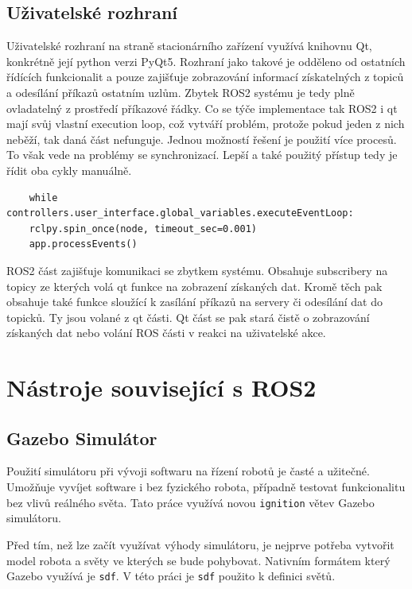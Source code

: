 \section{Uživatelské rozhraní}
Uživatelské rozhraní na straně stacionárního zařízení využívá knihovnu Qt, konkrétně její python verzi PyQt5. Rozhraní jako takové je odděleno od ostatních řídících funkcionalit a pouze zajišťuje zobrazování informací získatelných z topiců a odesílání příkazů ostatním uzlům. Zbytek ROS2 systému je tedy plně ovladatelný z prostředí příkazové řádky. Co se týče implementace tak ROS2 i qt mají svůj vlastní execution loop, což vytváří problém, protože pokud jeden z nich neběží, tak daná část nefunguje. Jednou možností řešení je použití více procesů. To však vede na problémy se synchronizací. Lepší a také použitý přístup tedy je řídit oba cykly manuálně. 
\begin{verbatim}
	while controllers.user_interface.global_variables.executeEventLoop:
	rclpy.spin_once(node, timeout_sec=0.001)
	app.processEvents()
\end{verbatim}
ROS2 část zajišťuje komunikaci se zbytkem systému. Obsahuje subscribery na topicy ze kterých volá qt funkce na zobrazení získaných dat. Kromě těch pak obsahuje také funkce sloužící k zasílání příkazů na servery či odesílání dat do topicků. Ty jsou volané z qt části.
Qt část se pak stará čistě o zobrazování získaných dat nebo volání ROS části v reakci na uživatelské akce.

\chapter{Nástroje související s ROS2}

\section{Gazebo Simulátor}
Použití simulátoru při vývoji softwaru na řízení robotů je časté a užitečné. Umožňuje vyvíjet software i bez fyzického robota, případně testovat funkcionalitu bez vlivů reálného světa. Tato práce využívá novou \verb|ignition| větev Gazebo simulátoru. 

Před tím, než lze začít využívat výhody simulátoru, je nejprve potřeba vytvořit model robota a světy ve kterých se bude pohybovat. Nativním formátem který Gazebo využívá je \verb|sdf|. V této práci je \verb|sdf| použito k definici světů.

